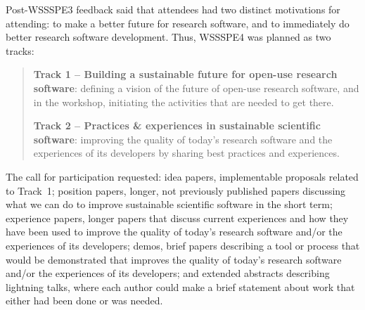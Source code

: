 \documentclass[11pt, oneside]{amsart}
\begin{document}
Post-WSSSPE3 feedback said that attendees
had two distinct motivations for attending:  to make a better future
for research software, and to immediately do better research software development. Thus,
WSSSPE4 was %
planned as two tracks:

\begin{quote}
    \textbf{Track 1 -- Building a sustainable future for open-use research
    software}: defining a vision of the future of open-use
    research software, and in the workshop, initiating the activities that are
    needed to get there.

    \noindent \textbf{Track 2 -- Practices \& experiences in sustainable scientific software}:
    improving the quality of today's research software and the
    experiences of its developers by sharing best practices and experiences.
\end{quote}

The call for participation requested:
idea papers, implementable proposals related to Track~1;
position papers, longer, not previously published papers
discussing what we can do to improve sustainable scientific
software in the short term;
experience papers, longer papers that discuss current
experiences and how they have been used to improve the quality of
today's research software and/or the experiences of its developers;
demos, brief papers describing a tool or
process that would be demonstrated that improves the quality of today's research
software and\slash or the experiences of its developers; and
extended abstracts describing lightning talks,
where each author could make a brief statement about work that either had been
done or was needed.
\end{document}
